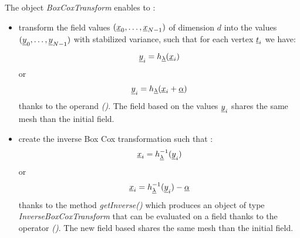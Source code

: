 The object \emph{BoxCoxTransform} enables to :
\begin{itemize}
\item  transform the field values  $({\underline{x}}_{0}, \dots,{\underline{x}}_{N-1})$ of dimension $d$ into the values $({\underline{y}}_{0}, \dots, {\underline{y}}_{N-1})$  with stabilized variance, such that for each vertex ${\underline{t}}_i$ we have:
  \begin{equation}\label{Eval}
    {\underline{y}}_{i} = h_{{\underline{\lambda}}}({\underline{x}}_{i})
  \end{equation}
  or
  \begin{equation}
    {\underline{y}}_{i} = h_{{\underline{\lambda}}}({\underline{x}}_{i} + {\underline{\alpha}})
  \end{equation}
  thanks to the operand  \emph{()}. The field based on the values ${\underline{y}}_{i}$ shares the same mesh than the initial field.
\item create the inverse Box Cox transformation such that :
  \begin{equation}
    {\underline{x}}_{i}= h^{-1}_{{\underline{\lambda}}}({\underline{y}}_{i} )
  \end{equation}
  or
  \begin{equation}
    {\underline{x}}_{i} = h^{-1}_{{\underline{\lambda}}}({\underline{y}}_{i} ) - {\underline{\alpha}}
  \end{equation}
  thanks to the method \emph{getInverse()} which produces an object of type \emph{InverseBoxCoxTransform} that can be evaluated on a field thanks to the operator  \emph{()}. The new field based  shares the same mesh than the initial field.
\end{itemize}



